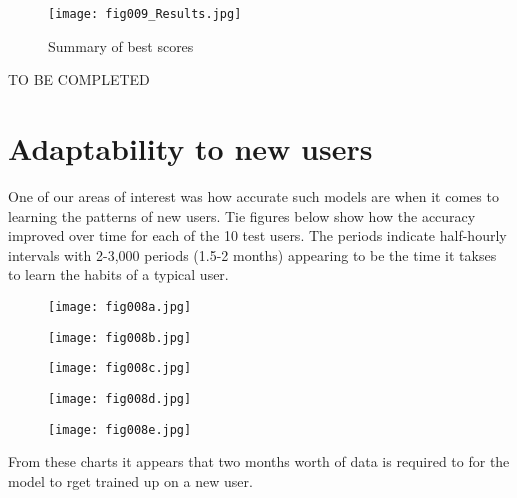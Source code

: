 \begin{figure}[h!]
	\centering
	\texttt{[image: fig009\_Results.jpg]}
	\caption{Summary of best scores}
	\label{fig9}
\end{figure} 

TO BE COMPLETED

\section{Adaptability to new users}

One of our areas of interest was how accurate such models are when it comes to learning the patterns of new users. Tie figures below show how the accuracy improved over time for each of the 10 test users. The periods indicate half-hourly intervals with 2-3,000 periods (1.5-2 months) appearing to be the time it takses to learn the habits of a typical user. 
\begin{figure}[h!]
	\centering
	\texttt{[image: fig008a.jpg]}
	\caption{}
	\label{fig:fig8a}
\end{figure} 

\begin{figure}[h!]
	\centering
	\texttt{[image: fig008b.jpg]}
	\caption{}
	\label{fig:fig8b}
\end{figure} 

\begin{figure}[h!]
	\centering
	\texttt{[image: fig008c.jpg]}
	\caption{}
	\label{fig:fig8c}
\end{figure} 

\begin{figure}[h!]
	\centering
	\texttt{[image: fig008d.jpg]}
	\caption{}
	\label{fig:fig8d}
\end{figure} 

\begin{figure}[h!]
	\centering
	\texttt{[image: fig008e.jpg]}
	\caption{}
	\label{fig:fig8e}
\end{figure} 


From these charts it appears that two months worth of data is required to for the model to rget trained up on a new user.

